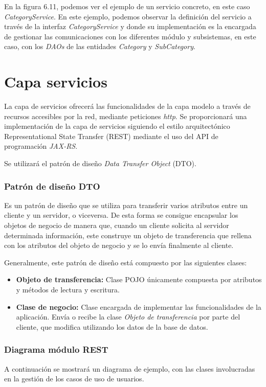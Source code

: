 En la figura 6.11, podemos ver el ejemplo de un servicio concreto, en este caso \textit{CategoryService}. En este ejemplo, podemos observar la definición del servicio a través de la interfaz \textit{CategoryService} y donde su implementación es la encargada de gestionar las comunicaciones con los diferentes módulo y subsistemas, en este caso, con los \textit{DAOs} de las entidades \textit{Category} y \textit{SubCategory}.

\section{Capa servicios}
La capa de servicios ofrecerá las funcionalidades de la capa modelo a través de recursos accesibles por la red, mediante peticiones \textit{http}. Se proporcionará una implementación de la capa de servicios siguiendo el  estilo arquitectónico Representational State Transfer (REST) mediante el uso del API de programación \textit{JAX-RS}.

Se utilizará el patrón de diseño \textit{Data Transfer Object} (DTO).

\subsubsection*{Patrón de diseño DTO}
Es un patrón de diseño que se utiliza para transferir varios atributos entre un cliente y un servidor, o viceversa. De esta forma se consigue encapsular los objetos de negocio de manera que, cuando un cliente solicita al servidor determinada información, este construye un objeto de transferencia que rellena con los atributos del objeto de negocio y se lo envía finalmente al cliente.

Generalmente, este patrón de diseño está compuesto por las siguientes clases:

\begin{itemize}
	\item \textbf{Objeto de transferencia: } Clase POJO únicamente compuesta por atributos y métodos de lectura y escritura.
	\item \textbf{Clase de negocio: } Clase encargada de implementar las funcionalidades de la aplicación. Envía o recibe la clase \textit{Objeto de transferencia} por parte del cliente, que modifica utilizando los datos de la base de datos.
\end{itemize}


\subsubsection*{Diagrama módulo REST}
A continuación se mostrará un diagrama de ejemplo, con las clases involucradas en la gestión de los casos de uso de usuarios.

